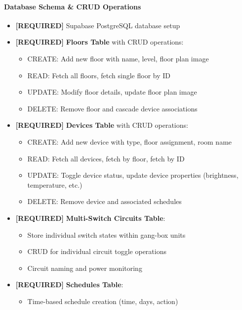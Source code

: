 \documentclass[12pt,a4paper]{article}
\begin{document}
\paragraph{Database Schema \& CRUD Operations}
\begin{itemize}[leftmargin=*]
    \item \textcolor{required}{\textbf{[REQUIRED]}} Supabase PostgreSQL database setup
    \item \textcolor{required}{\textbf{[REQUIRED]}} \textbf{Floors Table} with CRUD operations:
    \begin{itemize}
        \item CREATE: Add new floor with name, level, floor plan image
        \item READ: Fetch all floors, fetch single floor by ID
        \item UPDATE: Modify floor details, update floor plan image
        \item DELETE: Remove floor and cascade device associations
    \end{itemize}
    \item \textcolor{required}{\textbf{[REQUIRED]}} \textbf{Devices Table} with CRUD operations:
    \begin{itemize}
        \item CREATE: Add new device with type, floor assignment, room name
        \item READ: Fetch all devices, fetch by floor, fetch by ID
        \item UPDATE: Toggle device status, update device properties (brightness, temperature, etc.)
        \item DELETE: Remove device and associated schedules
    \end{itemize}
    \item \textcolor{required}{\textbf{[REQUIRED]}} \textbf{Multi-Switch Circuits Table}:
    \begin{itemize}
        \item Store individual switch states within gang-box units
        \item CRUD for individual circuit toggle operations
        \item Circuit naming and power monitoring
    \end{itemize}
    \item \textcolor{required}{\textbf{[REQUIRED]}} \textbf{Schedules Table}:
    \begin{itemize}
        \item Time-based schedule creation (time, days, action)

\end{itemize}
\end{itemize}
\end{document}
